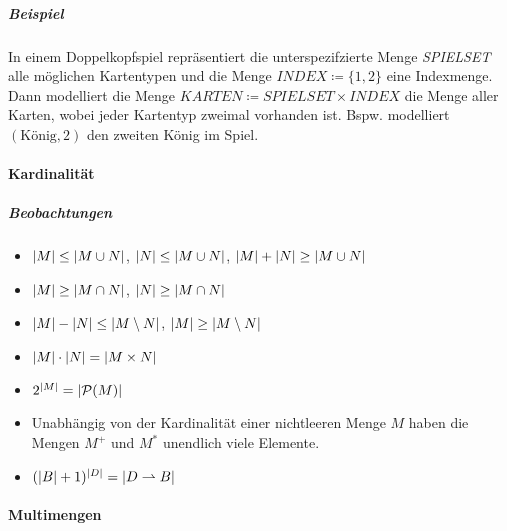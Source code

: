 		    \subparagraph{Beispiel}
		    In einem Doppelkopfspiel repräsentiert die unterspezifzierte Menge \textit{SPIELSET} alle möglichen Kartentypen und die Menge $ \textit{INDEX} \coloneqq \{ 1, 2 \} $ eine Indexmenge. Dann modelliert die Menge $ \textit{KARTEN} \coloneqq \textit{SPIELSET} \times \textit{INDEX} $ die Menge aller Karten, wobei jeder Kartentyp zweimal vorhanden ist. Bspw. modelliert $ (\text{König}, 2) $ den zweiten König im Spiel.
		    
	    
	    \paragraph{Kardinalität}
		    
		    \subparagraph{Beobachtungen}
		    \begin{itemize}
		    	\item $ \abs{M} \leq \abs{M \cup N} $, $ \abs{N} \leq \abs{M \cup N} $, $ \abs{M} + \abs{N} \geq \abs{M \cup N} $
		    	\item $ \abs{M} \geq \abs{M \cap N} $, $ \abs{N} \geq \abs{M \cap N} $
		    	\item $ \abs{M} - \abs{N} \leq \abs{M \setminus N} $, $ \abs{M} \geq \abs{M \setminus N} $
		    	\item $ \abs{M} \cdot \abs{N} = \abs{M \times N} $
		    	\item $ 2 ^ { \abs{M} } = \abs{\mathcal{P}(M)} $
		    	\item Unabhängig von der Kardinalität einer nichtleeren Menge $ M $ haben die Mengen $ M ^ + $ und $ M ^ * $ unendlich viele Elemente.
		    	\item $ (\abs{B} + 1) ^ \abs{D} = \abs{D \rightharpoonup B} $
		    \end{itemize}
	    
	    \paragraph{Multimengen}
		    
